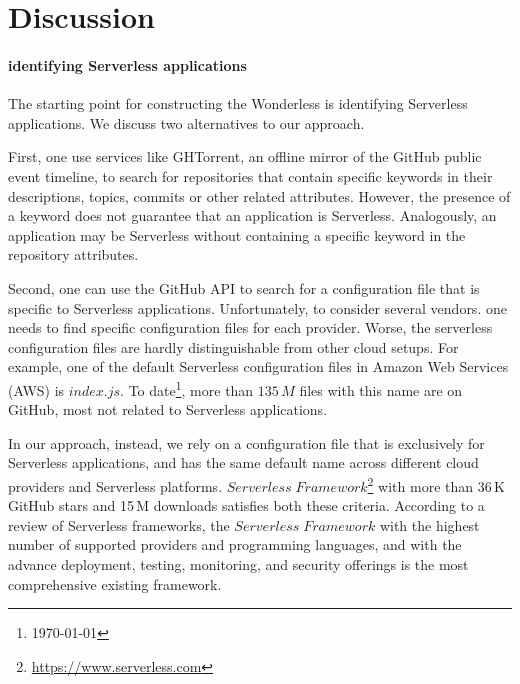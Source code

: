 
\section{Discussion}
\label{discussion}

\paragraph{identifying Serverless applications}
The starting point for constructing the Wonderless is identifying Serverless 
applications. We discuss two alternatives to our approach.

First, one use services like GHTorrent\cite{gousios2012ghtorrent}, 
an offline mirror of the GitHub public event timeline, to search for repositories 
that contain specific keywords in their descriptions, topics, commits or other 
related attributes. However, the presence of a keyword does not guarantee 
that an application is Serverless. Analogously, an application may be Serverless 
without containing a specific keyword in the repository attributes.

Second, one can use the GitHub API to search for a configuration file that is 
specific to Serverless applications. Unfortunately, to consider several vendors. 
one needs to find specific configuration files for each provider.
Worse, the serverless configuration files are hardly distinguishable from other cloud setups. 
For example, one of the default Serverless configuration files in Amazon 
Web Services\,(AWS) is $index.js$. To date\footnote{\today}, 
more than $135 \, M$ files with this name are on GitHub, most not 
related to Serverless applications. 

In our approach, instead, we rely on a configuration file that is exclusively 
for Serverless applications, and has the same default name across 
different cloud providers and Serverless platforms. 
$Serverless \; Framework$\footnote{\url{https://www.serverless.com}} 
with more than 36\,K GitHub stars and 15\,M downloads satisfies both these 
criteria. According to a review of Serverless frameworks\cite{kritikos2018review}, 
the $Serverless \; Framework$ with the highest number of supported providers 
and programming languages, and with the advance deployment, testing, 
monitoring, and security offerings is the most comprehensive existing framework. 









